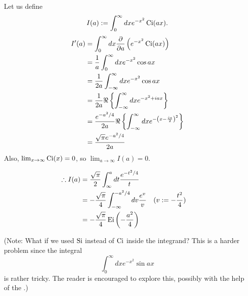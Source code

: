 \item

Let us define
\[
	I(a) := \int_0^\infty dx e^{-x^2} \operatorname{Ci}(ax).
\]
\begin{align*}
    I'(a)
    &= \int_0^\infty dx \frac{\partial}{\partial a} \left( e^{-x^2} \operatorname{Ci}(ax) \right) \\
    &= \frac{1}{a} \int_0^\infty dx e^{-x^2} \cos ax \\
    &= \frac{1}{2a} \int_{-\infty}^\infty dx e^{-x^2} \cos ax \\
    &= \frac{1}{2a} \Re \left\{ \int_{-\infty}^\infty dx e^{-x^2 + iax} \right\} \\
    &= \frac{e^{-a^2/4}}{2a} \Re \left\{ \int_{-\infty}^\infty dx e^{-{\left( x - \frac{ia}{2} \right)}^2} \right\} \\
    &= \frac{\sqrt{\pi} e^{-a^2/4}}{2a}
\end{align*}
Also, $\lim_{x \rightarrow \infty} \operatorname{Ci}(x) = 0$, so $\lim_{a \rightarrow \infty} I(a) = 0$.

\begin{align*}
    \therefore I(a)
    &= \frac{\sqrt{\pi}}{2} \int_\infty^a dt \frac{e^{-t^2/4}}{t} \\
    &= -\frac{\sqrt{\pi}}{4} \int_{-\infty}^{-a^2/4} dv \frac{e^v}{v} && (v := -\frac{t^2}{4}) \\
    &= -\frac{\sqrt{\pi}}{4} \operatorname{Ei}\left( -\frac{a^2}{4} \right)
\end{align*}

(Note: What if we used $\operatorname{Si}$ instead of $\operatorname{Ci}$ inside the integrand?
This is a harder problem since the integral
\[
    \int_0^\infty dx e^{-x^2} \sin ax
\]
is rather tricky.
The reader is encouraged to explore this, possibly with the help of the
.)
